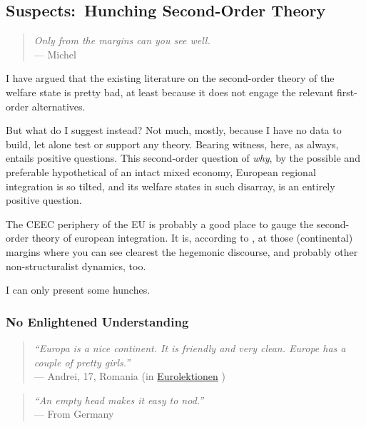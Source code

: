 \subsection[Suspects]{Suspects:\ Hunching Second-Order Theory}

\begin{quote}
	\emph{Only from the margins can you see well.}\\
	--- Michel \cite{Foucault-1972-aa}
\end{quote}

I have argued that the existing literature on the second-order theory of the welfare state is pretty bad, at least because it does not engage the relevant first-order alternatives.

But what do I suggest instead?
Not much, mostly, because I have no data to build, let alone test or support any theory.
Bearing witness, here, as always, entails positive questions.
This second-order question of \emph{why}, by the possible and preferable hypothetical of an intact mixed economy, European regional integration is so tilted, and its welfare states in such disarray, is an entirely positive question.

The \gls{CEEC} periphery of the \gls{EU} is probably a good place to gauge the second-order theory of european integration.
It is, according to \cite{Foucault-1972-aa}, at those (continental) margins where you can see clearest the hegemonic discourse, and probably other non-structuralist dynamics, too.

I can only present some hunches.

\subsubsection[No Enlightened Understanding]{No Enlightened Understanding}

\begin{quote}
	\emph{``Europa is a nice continent.
It is friendly and very clean.
Europe has a couple of pretty girls.''}\\
	--- Andrei, 17, Romania (in \href{http://eurolektionen.de}{Eurolektionen} \citeyear{DeRuffray2010})
\end{quote}

\begin{quote}
	\emph{``An empty head makes it easy to nod.''}\\
	--- From Germany
\end{quote}

